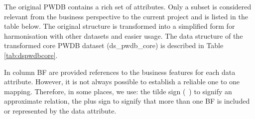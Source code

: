 The original PWDB contains a rich set of attributes. Only a subset is considered relevant from the business perspective to the current project and is listed in the table below. The original structure is transformed into a simplified form for harmonisation with other datasets and easier usage. The data structure of the transformed core PWDB dataset (ds\_pwdb\_core) is described in Table \ref{tab:dspwdbcore}.

In column BF are provided references to the business features for each data attribute. However, it is not always possible to establish a reliable one to one mapping. Therefore, in some places, we use: the tilde sign (~) to signify an approximate relation, the plus sign to signify that more than one BF is included or represented by the data attribute.

